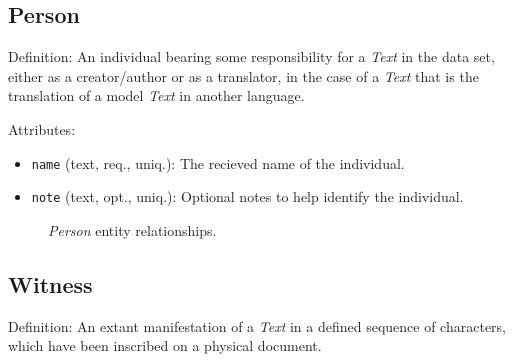 
\subsection{Person}

Definition: An individual bearing some responsibility for a \textit{Text} in the data set, either as a creator/author or as a translator, in the case of a \textit{Text} that is the translation of a model \textit{Text} in another language.

\vspace{1em}
\noindent Attributes:
\begin{itemize}
    \item \texttt{name} (text, req., uniq.): The recieved name of the individual.
    \item \texttt{note} (text, opt., uniq.): Optional notes to help identify the individual.
\end{itemize}

\begin{figure}[ht]
    \begin{center}
        
    \end{center}
\label{fig:PersonER}
\caption{\textit{Person} entity relationships.}
\end{figure}


\subsection{Witness}

Definition: An extant manifestation of a \textit{Text} in a defined sequence of characters, which have been inscribed on a physical document.

